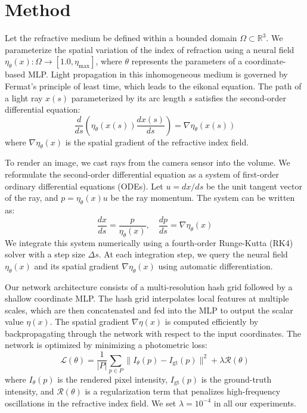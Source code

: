\section{Method}
Let the refractive medium be defined within a bounded domain $\Omega \subset \mathbb{R}^3$. We parameterize the spatial variation of the index of refraction using a neural field $\eta_\theta(x): \Omega \to [1.0, \eta_{\text{max}}]$, where $\theta$ represents the parameters of a coordinate-based MLP. Light propagation in this inhomogeneous medium is governed by Fermat's principle of least time, which leads to the eikonal equation. The path of a light ray $x(s)$ parameterized by its arc length $s$ satisfies the second-order differential equation:
\begin{equation}
  \frac{d}{ds} \left( \eta_\theta(x(s)) \frac{dx(s)}{ds} \right) = \nabla \eta_\theta(x(s))
  \label{eq:eikonal}
\end{equation}
where $\nabla \eta_\theta(x)$ is the spatial gradient of the refractive index field.

To render an image, we cast rays from the camera sensor into the volume. We reformulate the second-order differential equation as a system of first-order ordinary differential equations (ODEs). Let $u = dx/ds$ be the unit tangent vector of the ray, and $p = \eta_\theta(x) u$ be the ray momentum. The system can be written as:
\begin{equation}
  \frac{dx}{ds} = \frac{p}{\eta_\theta(x)}, \quad \frac{dp}{ds} = \nabla \eta_\theta(x)
\end{equation}
We integrate this system numerically using a fourth-order Runge-Kutta (RK4) solver with a step size $\Delta s$. At each integration step, we query the neural field $\eta_\theta(x)$ and its spatial gradient $\nabla \eta_\theta(x)$ using automatic differentiation.

Our network architecture consists of a multi-resolution hash grid followed by a shallow coordinate MLP. The hash grid interpolates local features at multiple scales, which are then concatenated and fed into the MLP to output the scalar value $\eta(x)$. The spatial gradient $\nabla \eta(x)$ is computed efficiently by backpropagating through the network with respect to the input coordinates. The network is optimized by minimizing a photometric loss:
\begin{equation}
  \mathcal{L}(\theta) = \frac{1}{|P|} \sum_{p \in P} \| I_\theta(p) - I_{\text{gt}}(p) \|^2 + \lambda \mathcal{R}(\theta)
\end{equation}
where $I_\theta(p)$ is the rendered pixel intensity, $I_{\text{gt}}(p)$ is the ground-truth intensity, and $\mathcal{R}(\theta)$ is a regularization term that penalizes high-frequency oscillations in the refractive index field. We set $\lambda = 10^{-4}$ in all our experiments.

